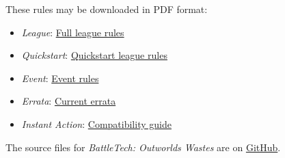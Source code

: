 
These rules may be downloaded in PDF format:


\begin{itemize}

\item \emph{League}: \href{https://raw.githubusercontent.com/Eudicods/outworlds-wastes/rules-pdf/battletech-outworlds-wastes.pdf}{Full league rules}

\item \emph{Quickstart}: \href{https://raw.githubusercontent.com/Eudicods/outworlds-wastes/rules-pdf/battletech-outworlds-wastes-quickstart.pdf}{Quickstart league rules}

\item \emph{Event}: \href{https://raw.githubusercontent.com/Eudicods/outworlds-wastes/rules-pdf/battletech-outworlds-wastes-event.pdf}{Event rules}

\item \emph{Errata}: \href{https://raw.githubusercontent.com/Eudicods/outworlds-wastes/rules-pdf/battletech-outworlds-wastes-errata.pdf}{Current errata}

\item \emph{Instant Action}: \href{https://raw.githubusercontent.com/Eudicods/outworlds-wastes/rules-pdf/battletech-outworlds-wastes-instant-action.pdf}{Compatibility guide}

\end{itemize}





The source files for \emph{BattleTech: Outworlds Wastes} are on \href{https://github.com/Eudicods/outworlds-wastes}{GitHub}.
